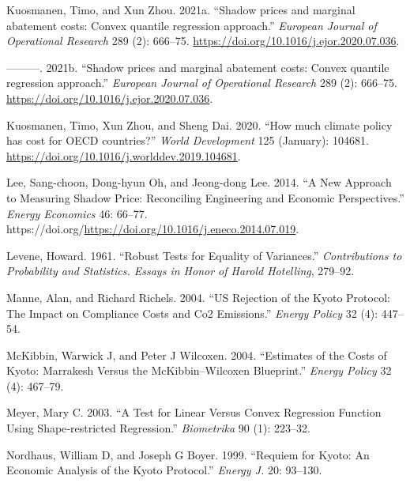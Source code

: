 \documentclass[
  letterpaper,
  DIV=11,
  numbers=noendperiod]{scrartcl}
\newlength{\cslhangindent}
\newlength{\cslentryspacingunit} %
\newenvironment{CSLReferences}[2] %
 {%
  \setlength{\parindent}{0pt}
  \ifodd #1
  \let\oldpar\par
  \def\par{\hangindent=\cslhangindent\oldpar}
  \fi
  \setlength{\parskip}{#2\cslentryspacingunit}
 }%
 {}
\begin{document}
\begin{CSLReferences}{1}{0}
\leavevmode{}%
Kuosmanen, Timo, and Xun Zhou. 2021a. {``{Shadow prices and marginal
abatement costs: Convex quantile regression approach}.''} \emph{European
Journal of Operational Research} 289 (2): 666--75.
\url{https://doi.org/10.1016/j.ejor.2020.07.036}.

\leavevmode{}%
---------. 2021b. {``{Shadow prices and marginal abatement costs: Convex
quantile regression approach}.''} \emph{European Journal of Operational
Research} 289 (2): 666--75.
\url{https://doi.org/10.1016/j.ejor.2020.07.036}.

\leavevmode{}%
Kuosmanen, Timo, Xun Zhou, and Sheng Dai. 2020. {``{How much climate
policy has cost for OECD countries?}''} \emph{World Development} 125
(January): 104681. \url{https://doi.org/10.1016/j.worlddev.2019.104681}.

\leavevmode{}%
Lee, Sang-choon, Dong-hyun Oh, and Jeong-dong Lee. 2014. {``A New
Approach to Measuring Shadow Price: Reconciling Engineering and Economic
Perspectives.''} \emph{Energy Economics} 46: 66--77.
https://doi.org/\url{https://doi.org/10.1016/j.eneco.2014.07.019}.

\leavevmode{}%
Levene, Howard. 1961. {``Robust Tests for Equality of Variances.''}
\emph{Contributions to Probability and Statistics. Essays in Honor of
Harold Hotelling}, 279--92.

\leavevmode{}%
Manne, Alan, and Richard Richels. 2004. {``{US} Rejection of the Kyoto
Protocol: The Impact on Compliance Costs and {Co2} Emissions.''}
\emph{Energy Policy} 32 (4): 447--54.

\leavevmode{}%
McKibbin, Warwick J, and Peter J Wilcoxen. 2004. {``Estimates of the
Costs of Kyoto: Marrakesh Versus the {McKibbin--Wilcoxen} Blueprint.''}
\emph{Energy Policy} 32 (4): 467--79.

\leavevmode{}%
Meyer, Mary C. 2003. {``A Test for Linear Versus Convex Regression
Function Using Shape‐restricted Regression.''} \emph{Biometrika} 90 (1):
223--32.

\leavevmode{}%
Nordhaus, William D, and Joseph G Boyer. 1999. {``Requiem for Kyoto: An
Economic Analysis of the Kyoto Protocol.''} \emph{Energy J.} 20:
93--130.


\end{CSLReferences}
\end{document}
